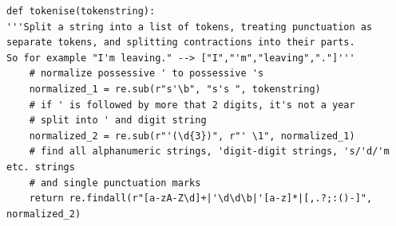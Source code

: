 \documentclass{article}
\begin{document}
\begin{lstlisting}
def tokenise(tokenstring):
'''Split a string into a list of tokens, treating punctuation as
separate tokens, and splitting contractions into their parts.
So for example "I'm leaving." --> ["I","'m","leaving","."]'''
	# normalize possessive ' to possessive 's
	normalized_1 = re.sub(r"s'\b", "s's ", tokenstring)
	# if ' is followed by more that 2 digits, it's not a year
	# split into ' and digit string
	normalized_2 = re.sub(r"'(\d{3})", r"' \1", normalized_1)
	# find all alphanumeric strings, 'digit-digit strings, 's/'d/'m etc. strings
	# and single punctuation marks
	return re.findall(r"[a-zA-Z\d]+|'\d\d\b|'[a-z]*|[,.?;:()-]", normalized_2)
\end{lstlisting}
\end{document}
